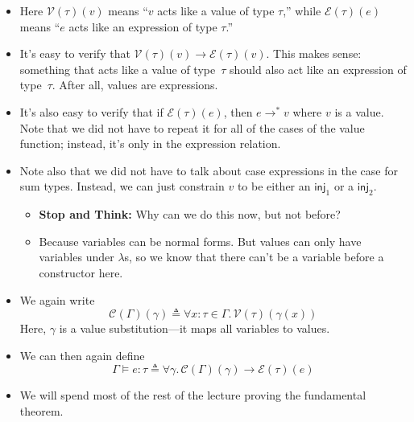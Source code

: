 \documentclass{lecturenotes}
\begin{document}
\begin{itemize}
\item Here $\mathcal{V}(\tau)(v)$ means ``$v$ acts like a value of type $\tau$,'' while $\mathcal{E}(\tau)(e)$ means ``$e$ acts like an expression of type $\tau$.''
\item It's easy to verify that $\mathcal{V}(\tau)(v) \to \mathcal{E}(\tau)(v)$.
  This makes sense: something that acts like a value of type~$\tau$ should also act like an expression of type~$\tau$.
  After all, values are expressions.
\item It's also easy to verify that if $\mathcal{E}(\tau)(e)$, then $e \to^\ast v$ where $v$ is a value.
  Note that we did not have to repeat it for all of the cases of the value function; instead, it's only in the expression relation.
\item Note also that we did not have to talk about \textsf{case} expressions in the case for sum types.
  Instead, we can just constrain $v$ to be either an $\textsf{inj}_1$ or a $\textsf{inj}_2$.
  \begin{itemize}
  \item \textbf{Stop and Think:} Why can we do this now, but not before?
  \item Because variables can be normal forms.
    But values can only have variables under $\lambda$s, so we know that there can't be a variable before a constructor here.
  \end{itemize}
\item We again write $$\mathcal{C}(\Gamma)(\gamma) \triangleq \forall x : \tau \in \Gamma.\, \mathcal{V}(\tau)(\gamma(x))$$
  Here, $\gamma$ is a value substitution---it maps all variables to values.
\item We can then again define $$\Gamma \vDash e : \tau \triangleq \forall \gamma.\,\mathcal{C}(\Gamma)(\gamma) \to \mathcal{E}(\tau)(e)$$
\item We will spend most of the rest of the lecture proving the fundamental theorem.
\end{itemize}
\end{document}
